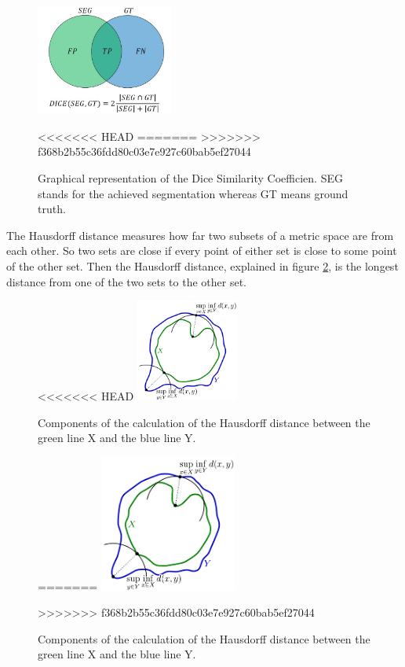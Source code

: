 \documentclass[journal]{IEEEtran}
\begin{document}
	\begin{figure}[h]
		\centering
		\includegraphics[width=0.4\textwidth]{diceGraphics}
		\caption{Graphical representation of the Dice Similarity Coefficien. SEG stands for the achieved segmentation whereas GT means ground truth.}
<<<<<<< HEAD
		\label{fig:figure2}
=======
		\label{fig:e2}
>>>>>>> f368b2b55c36fdd80c03e7e927c60bab5ef27044
	\end{figure}

	The Hausdorff distance measures how far two subsets of a metric space are from each other. So two sets are close if every point of either set is close 
	to some point of the other set. Then the Hausdorff distance, explained in figure \ref{fig:e3}, is the longest distance from one of the two sets to the other set.

	\begin{figure}[h]
		\centering
<<<<<<< HEAD
		\includegraphics[width=0.3\textwidth]{haussdorfGraphics.png}
		\caption{Components of the calculation of the Hausdorff distance between the green line X and the blue line Y.}
		\label{fig:figure3}
=======
		\includegraphics[width=0.4\textwidth]{haussdorfGraphics}
		\caption{Components of the calculation of the Hausdorff distance between the green line X and the blue line Y.}
		\label{fig:e3}
>>>>>>> f368b2b55c36fdd80c03e7e927c60bab5ef27044
	\end{figure}
\end{document}
